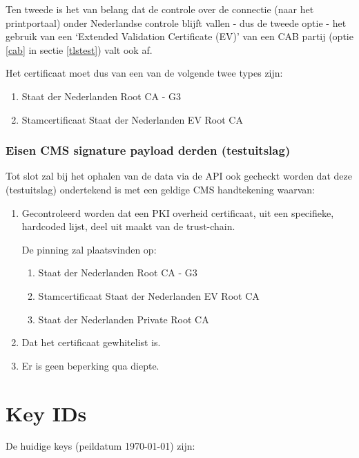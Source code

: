 \documentclass[11.0pt,twoside,openright]{report}
\begin{document}
Ten tweede is het van belang dat de controle over de connectie (naar het printportaal) onder Nederlandse controle blijft vallen - dus de tweede optie - het gebruik van een `Extended Validation Certificate (EV)' van een CAB partij (optie \ref{cab} in  sectie \ref{tlstest}) valt ook af. 

Het certificaat moet dus van een van de volgende twee types zijn:

\begin{enumerate}
\item Staat der Nederlanden Root CA - G3
\item Stamcertificaat Staat der Nederlanden EV Root CA 
\end{enumerate}
 
\pagebreak
\subsection{Eisen CMS signature payload derden (testuitslag)}

Tot slot zal bij het ophalen van de data via de API ook gecheckt worden dat deze (testuitslag) ondertekend is met een geldige CMS handtekening waarvan:

\begin{enumerate}
\item	Gecontroleerd worden dat een PKI overheid certificaat, uit een specifieke, hardcoded lijst, deel uit maakt van de trust-chain.

De pinning zal plaatsvinden op:

\begin{enumerate}
\item Staat der Nederlanden Root CA - G3
\item Stamcertificaat Staat der Nederlanden EV Root CA 
\item Staat der Nederlanden Private Root CA 
\end{enumerate}
\item Dat het certificaat gewhitelist is.
\item Er is geen beperking qua diepte.
\end{enumerate}



\appendix
\chapter{Key IDs}
\label{keyid}

De huidige keys (peildatum \today) zijn:\\
\end{document}
